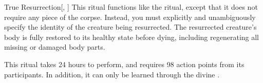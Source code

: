 \lowercase{\hypertarget{spell:True Resurrection}{}}\label{spell:True Resurrection}
\begin{apability}[Rank 8]{\hypertarget{spell:True Resurrection}{True Resurrection}}[, ]
This ritual functions like the  ritual, except that it does not require any piece of the corpse.
Instead, you must explicitly and unambiguously specify the identity of the creature being resurrected.
The resurrected creature's body is fully restored to its healthy state before dying, including regenerating all missing or damaged body parts.

This ritual takes 24 hours to perform, and requires 98 action points from its participants.
In addition, it can only be learned through the divine .
\end{apability}
\vspace{0.25em}

